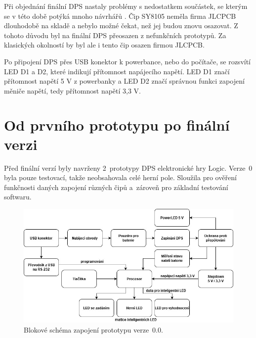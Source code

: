   Při objednání finální DPS nastaly problémy s nedostatkem součástek, se kterým se v této době potýká mnoho návrhářů \cite{Nedostatek_soucastek}. 
  Čip SY8105 neměla firma JLCPCB dlouhodobě na skladě a nebylo možné čekat, než jej budou znovu osazovat. Z tohoto důvodu byl na finální DPS přeosazen 
  z nefunkčních prototypů. Za klasických okolností by byl ale i tento čip osazen firmou JLCPCB.

  Po připojení DPS přes USB konektor k powerbance, nebo do počítače, se rozsvítí LED D1 a D2, které indikují přítomnost 
  napájecího napětí. LED D1 značí přítomnost napětí 5 V z powerbanky a LED D2 značí správnou funkci zapojení měniče napětí, tedy přítomnost 
  napětí 3,3 V.

  \chapter{Od prvního prototypu po finální verzi}

  Před finální verzí byly navrženy 2~prototypy DPS elektronické hry Logic. Verze~0 byla pouze testovací, takže neobsahovala celé herní pole. 
  Sloužila pro ověření funkčnosti daných zapojení různých čipů a~zároveň pro základní testování softwaru.

  \begin{figure}[!h]
    \begin{center}
      \includegraphics[scale=0.5]{obrazky/v0_blokove_schema.jpg}
    \end{center}
    \caption[Blokové schéma zapojení prototypu verze~0.0]{Blokové schéma zapojení prototypu verze~0.0.}
  \end{figure}

